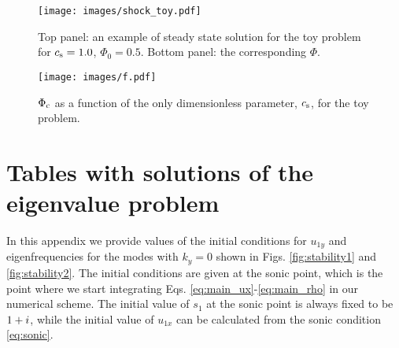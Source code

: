 \documentclass[useAMS,usenatbib]{mn2e}
\begin{document}
\begin{figure}
\texttt{[image: images/shock\_toy.pdf]}
 \caption{Top panel: an example of steady state solution for the toy problem for $c_{\rm s}=1.0$, $\Phi_0=0.5$. Bottom panel: the corresponding $\Phi$.}
\label{fig:toy1} 
\end{figure}

\begin{figure}
\texttt{[image: images/f.pdf]}
 \caption{$\Phi_{\rm c}$ as a function of the only dimensionless parameter, $c_{\rm s}$, for the toy problem.}
\label{fig:toyf} 
\end{figure}

\section{Tables with solutions of the eigenvalue problem} \label{appendix:tables}

In this appendix we provide values of the initial conditions for $u_{1y}$ and eigenfrequencies for the modes with $k_y=0$ shown in Figs. \ref{fig:stability1} and \ref{fig:stability2}. The initial conditions are given at the sonic point, which is the point where we start integrating Eqs. \eqref{eq:main_ux}-\eqref{eq:main_rho} in our numerical scheme. The initial value of $s_1$ at the sonic point is always fixed to be $1+i$, while the initial value of $u_{1x}$ can be calculated from the sonic condition \eqref{eq:sonic}.

\clearpage
\end{document}
